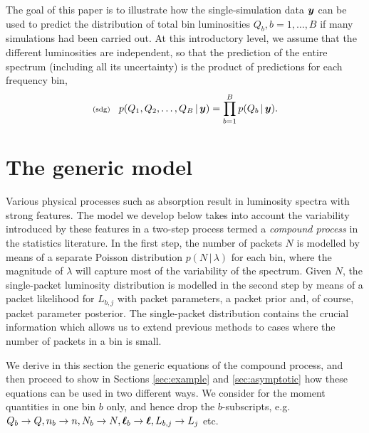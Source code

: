 \documentclass[11pt]{article}
\newcommand{\fred}[1]{\todo[color=orange!40,inline]{#1}} %
\newcommand{\lleq}[1]{\label{#1} }
\renewcommand{\lleq}[1]{\label{#1} {\scriptstyle {\rm (#1)}} \hspace*{2ex} }
\newcommand{\cond}{\,|\,}
\newcommand{\Lum}{L}
\begin{document}
The goal of this paper is to illustrate how the single-simulation data
${\bm{y}}$ can be used to predict the distribution of total bin
luminosities $Q_b, b = 1,\ldots,B$ if many simulations had been
carried out. At this introductory level, we assume that the different
luminosities are independent, so that the prediction of the entire
spectrum (including all its uncertainty) is the product of predictions
for each frequency bin,
\begin{align}
  \lleq{sdg}
  p(Q_1,Q_2,\ldots,Q_B\cond\bmy) = \prod_{b=1}^B p(Q_b\cond \bmy).
\end{align}

\section{The generic model} \label{sec:model}

Various physical processes such as absorption result in luminosity
spectra with strong features. The model we develop below takes into
account the variability introduced by these features in a two-step
process termed a \textit{compound process} in the statistics
literature.
%
In the first step, the number of packets $N$ is modelled by means of a
separate Poisson distribution $p(N\cond\lambda)$ for each bin, where
the magnitude of $\lambda$ will capture most of the variability of the
spectrum. Given $N$, the single-packet luminosity distribution is
modelled in the second step by means of a packet likelihood for
$\Lum_{b,j}$ with packet parameters, a packet prior and, of course,
packet parameter posterior. The single-packet distribution contains
the crucial information which allows us to extend previous methods to
cases where the number of packets in a bin is small.
\fred{Refs: Zech, maybe others, too}


We derive in this section the generic equations of the compound
process, and then proceed to show in Sections \ref{sec:example} and
\ref{sec:asymptotic} how these equations can be used in two different
ways.
%
We consider for the moment quantities in one bin $b$ only, and hence
drop the $b$-subscripts, e.g.\
$Q_b \to Q, n_b \to n, N_b\to N, {\bm{\ell}}_b\to{\bm{\ell}}, L_{b,j} \to L_j$ etc.
\end{document}
